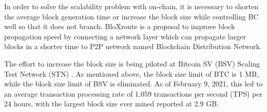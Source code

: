 \documentclass[graybox]{svmult}
\begin{document}
In order to solve the scalability problem with on-chain, it is necessary to shorten the average block generation time or increase the block size while controlling BC well so that it does not branch.
BloXroute\cite{bloX} is a proposal to improve block propagation speed by connecting a network layer which can propagate larger blocks in a shorter time to P2P network named Blockchain Distribution Network.


The effort to increase the block size is being piloted at Bitcoin SV (BSV) \cite{bsv} Scaling Test Network (STN) \cite{bitcoinscaling}.
As mentioned above, the block size limit of BTC is 1 MB, while the block size limit of BSV is eliminated.
As of February 9, 2021, this led to an average transaction processing rate of 1,059 transactions per second (TPS) per 24 hours, with the largest block size ever mined reported at 2.9 GB.
\end{document}
